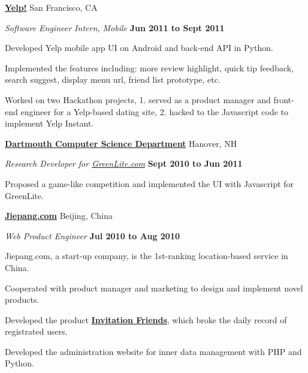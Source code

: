 \documentclass[10pt]{article}
\newenvironment{outerlist}[1][\enskip\textbullet]%
        {\begin{itemize}[#1]}{\end{itemize}%
         \vspace{-.6\baselineskip}}
\newenvironment{innerlist}[1][\enskip\textbullet]%
        {\begin{compactitem}[#1]}{\end{compactitem}}
\newcommand{\blankline}{\quad\pagebreak[2]}
\begin{document}
\href{http://yelp.com/}{\textbf{Yelp!}}
San Francisco, CA
\begin{outerlist}
\item[] \textit{Software Engineer Intern, Mobile}
        \hfill \textbf{Jun 2011 to Sept 2011}
\begin{innerlist}
\item Developed Yelp mobile app UI on Android and back-end API in Python.
\item Implemented the features including: 
    more review highlight, quick tip feedback,
    search suggest, display menu url,
    friend list prototype, etc.
\item Worked on two Hackathon projects, 
    1. served as a product manager and front-end engineer for a Yelp-based dating site,
    2. hacked to the Javascript code to implement Yelp Instant.
\end{innerlist}
\end{outerlist}
\blankline

\href{http://www.cs.dartmouth.edu/}{\textbf{Dartmouth Computer Science Department}}
Hanover, NH 
\begin{outerlist}
\item[] \textit{Research Developer for \href{http://greenlite2.cs.dartmouth.edu/}{GreenLite.com}}%
        \hfill \textbf{Sept 2010 to Jun 2011}
\begin{innerlist}
\item Proposed a game-like competition and implemented the UI with Javascript for GreenLite.
\end{innerlist}
\end{outerlist}
\blankline

\href{http://jiepang.com/}{\textbf{Jiepang.com}}
Beijing, China
\begin{outerlist}
\item[] \textit{Web Product Engineer}%
        \hfill \textbf{Jul 2010 to Aug 2010}
\begin{innerlist}
\item Jiepang.com, a start-up company, is the 1st-ranking location-based service in China.
\item Cooperated with product manager and marketing to design and implement novel products.
\item Developed the product \href{http://jiepang.com/events/invite/}{\textbf{Invitation Friends}}, which broke the daily record of registrated users.
\item Developed the administration website for inner data management with PHP and Python.
\end{innerlist}
\end{outerlist}
\end{document}
